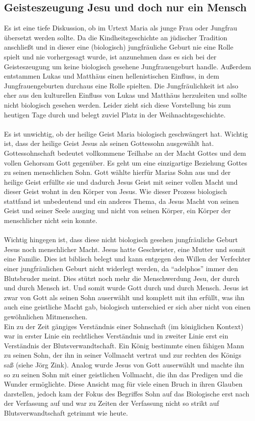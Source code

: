 \subsection{Geisteszeugung Jesu und doch nur ein Mensch}
Es ist eine tiefe Diskussion, ob im Urtext Maria als junge Frau oder Jungfrau übersetzt werden sollte. Da die Kindheitsgeschichte an jüdischer Tradition anschließt und in dieser eine (biologisch) jungfräuliche Geburt nie eine Rolle spielt und nie vorhergesagt wurde, ist anzunehmen dass es sich bei der Geisteszeugung um keine biologisch gesehene Jungfrauengeburt handle. Außerdem entstammen Lukas und Matthäus einen hellenistischen Einfluss, in dem Jungfrauengeburten durchaus eine Rolle spielten. Die Jungfräulichkeit ist also eher aus den kulturellen Einfluss von Lukas und Matthäus herzuleiten und sollte nicht biologisch gesehen werden. Leider zieht sich diese Vorstellung bis zum heutigen Tage durch und belegt zuviel Platz in der Weihnachtsgeschichte.
\\~\\
Es ist unwichtig, ob der heilige Geist Maria biologisch geschwängert hat. Wichtig ist, dass der heilige Geist Jesus als seinen Gottessohn ausgewählt hat. Gottessohnschaft bedeutet vollkommene Teilhabe an der Macht Gottes und dem vollen Gehorsam Gott gegenüber. Es geht um eine einzigartige Beziehung Gottes zu seinen menschlichen Sohn. Gott wählte hierfür Marias Sohn aus und der heilige Geist erfüllte sie und dadurch Jesus Geist mit seiner vollen Macht und dieser Geist wohnt in den Körper von Jesus. Wie dieser Prozess biologisch stattfand ist unbedeutend und ein anderes Thema, da Jesus Macht von seinen Geist und seiner Seele ausging und nicht von seinen Körper, ein Körper der menschlicher nicht sein konnte.
\\~\\
Wichtig hingegen ist, dass diese nicht biologisch gesehen jungfräuliche Geburt Jesus noch menschlicher Macht. Jesus hatte Geschwister, eine Mutter und somit eine Familie. Dies ist biblisch belegt und kann entgegen den Willen der Verfechter einer jungfräulichen  Geburt nicht widerlegt werden, da ``adelphos'' immer den Blutsbruder meint. Dies stützt noch mehr die Menschwerdung Jesu, der durch und durch Mensch ist. Und somit wurde Gott durch und durch Mensch. Jesus ist zwar von Gott als seinen Sohn auserwählt und komplett mit ihn erfüllt, was ihn auch eine geistliche Macht gab, biologisch unterschied er sich aber nicht von einen gewöhnlichen Mitmenschen.
\\
Ein zu der Zeit gängiges Verständnis einer Sohnschaft (im königlichen Kontext) war in erster Linie ein rechtliches Verständnis und in zweiter Linie erst ein Verständnis der Blutsverwandtschaft. Ein König bestimmte einen fähigen Mann zu seinen Sohn, der ihn in seiner Vollmacht vertrat und zur rechten des Königs saß (siehe Jörg Zink). Analog wurde Jesus von Gott auserwählt und machte ihn so zu seinen Sohn mit einer geistlichen Vollmacht, die ihn das Predigen und die Wunder ermöglichte. Diese Ansicht mag für viele einen Bruch in ihren Glauben darstellen, jedoch kam der Fokus des Begriffes Sohn auf das Biologische erst nach der Verfassung auf und war zu Zeiten der Verfassung nicht so strikt auf Blutsverwandtschaft getrimmt wie heute. 
